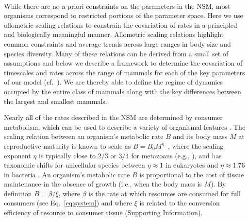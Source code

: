 \documentclass{pnastwo}
\begin{document}
\begin{article}
 \\ 
While there are no a priori constraints on the parameters in the NSM, most
organisms correspond to restricted portions of the parameter space.  Here we
use allometric scaling relations to constrain the covariation of rates in a
principled and biologically meaningful manner.  Allometric scaling relations
highlight common constraints and average trends across large ranges in body
size and species diversity. Many of these relations can be derived from a
small set of assumptions and below we describe a framework to determine the
covariation of timescales and rates across the range of mammals for each of
the key parameters of our model (cf.~\cite{Yodzis:1992hg}).  We are thereby
able to define the regime of dynamics occupied by the entire class of mammals
along with the key differences between the largest and smallest mammals.


Nearly all of the rates described in the NSM are determined by consumer
metabolism, which can be used to describe a variety of organismal features
\cite{Brown:2004wq}.  The scaling relation between an organism's metabolic
rate $B$ and its body mass $M$ at reproductive maturity is known to scale as
$B = B_0 M^\eta$~\cite{West:2002it}, where the scaling exponent $\eta$ is
typically close to $2/3$ or $3/4$ for metazoans (e.g., \cite{Brown:2004wq}),
and has taxonomic shifts for unicellular species between $\eta\approx 1$ in
eukaryotes and $\eta\approx 1.76$ in bacteria
\cite{DeLong:2010dy,Kempes:2012hy}.
An organism's metabolic rate $B$ is proportional to the cost of tissue
maintenance in the absence of growth (i.e., when the body mass is $M$).  By
definition $B=\beta/\xi$, where $\beta$ is the rate at which resources are
consumed for full consumers (see Eq.~\eqref{eq:system}) and where $\xi$ is
related to the conversion efficiency of resource to consumer tissue
(Supporting Information).


\end{article}
\end{document}
